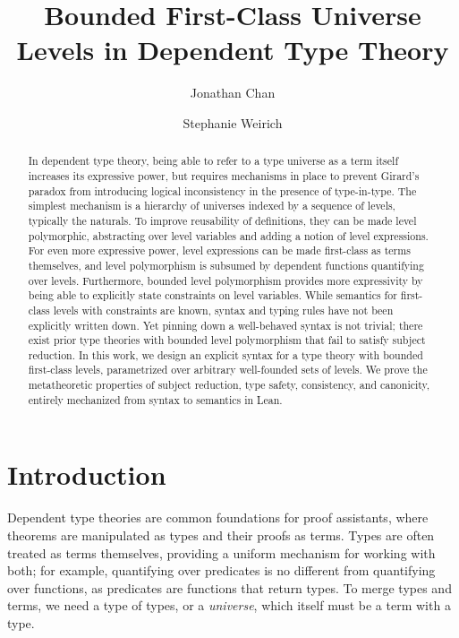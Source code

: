 \documentclass[a4paper,UKenglish,cleveref,autoref,thm-restate]{lipics-v2021}
\title{Bounded First-Class Universe Levels \titlebreak in Dependent Type Theory}
\author{Jonathan Chan}
  {University of Pennsylvania, Philadelphia, USA}
  {jcxz@seas.upenn.edu}
  {0000-0003-0830-3180}
  {}
\author{Stephanie Weirich}
  {University of Pennsylvania, Philadelphia, USA}
  {sweirich@seas.upenn.edu}
  {0000-0002-6756-9168}
  {}
\begin{document}
\setlength{\abovedisplayskip}{0.25\baselineskip}
\setlength{\belowdisplayskip}{0.25\baselineskip}

\maketitle

\begin{abstract}
  In dependent type theory,
  being able to refer to a type universe as a term itself increases its expressive power,
  but requires mechanisms in place to prevent Girard's paradox
  from introducing logical inconsistency in the presence of type-in-type.
  The simplest mechanism is a hierarchy of universes indexed by a sequence of levels,
  typically the naturals.
  To improve reusability of definitions, they can be made level polymorphic,
  abstracting over level variables and adding a notion of level expressions.
  For even more expressive power,
  level expressions can be made first-class as terms themselves,
  and level polymorphism is subsumed by dependent functions quantifying over levels.
  Furthermore, bounded level polymorphism provides more expressivity
  by being able to explicitly state constraints on level variables.
  While semantics for first-class levels with constraints are known,
  syntax and typing rules have not been explicitly written down.
  Yet pinning down a well-behaved syntax is not trivial;
  there exist prior type theories with bounded level polymorphism
  that fail to satisfy subject reduction.
  In this work, we design an explicit syntax for
  a type theory with bounded first-class levels,
  parametrized over arbitrary well-founded sets of levels.
  We prove the metatheoretic properties of subject reduction,
  type safety, consistency, and canonicity,
  entirely mechanized from syntax to semantics in Lean.
\end{abstract}

\section{Introduction}

Dependent type theories are common foundations for proof assistants,
where theorems are manipulated as types and their proofs as terms.
Types are often treated as terms themselves,
providing a uniform mechanism for working with both;
for example, quantifying over predicates is no different from quantifying over functions,
as predicates are functions that return types.
To merge types and terms, we need a type of types, or a \emph{universe},
which itself must be a term with a type.
\end{document}

